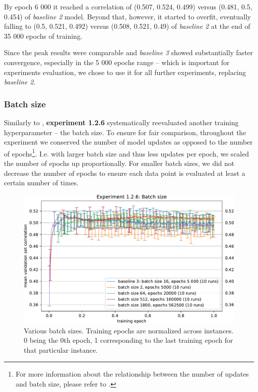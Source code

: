 By epoch 6 000 it reached a correlation of (0.507, 0.524, 0.499) versus (0.481, 0.5, 0.454) of \emph{baseline 2} model. Beyond that, however, it started to overfit, eventually falling to (0.5, 0.521, 0.492) versus (0.508, 0.521, 0.49) of \emph{baseline 2} at the end of 35 000 epochs of training. 

Since the peak results were comparable and \emph{baseline 3} showed substantially faster convergence, especially in the 5 000 epochs range -- which is important for experiments evaluation, we chose to use it for all further experiments, replacing \emph{baseline 2}.

\subsubsection{Batch size}

Similarly to , \textbf{experiment 1.2.6} systematically reevaluated another training hyperparameter -- the batch size. To ensure for fair comparison, throughout the experiment we conserved the number of model updates as opposed to the number of epochs\footnote{For more information about the relationship between the number of updates and batch size, please refer to .}. I.e. with larger batch size and thus less updates per epoch, we scaled the number of epochs up proportionally. For smaller batch sizes, we did not decrease the number of epochs to ensure each data point is evaluated at least a certain number of times.

\begin{figure}[H]
    \centering
    \includegraphics[width=1\textwidth]{../figures/05_1_2_6}
    \caption[Experiment 1.2.6]{Various batch sizes. Training epochs are normalized across instances. 0 being the 0th epoch, 1 corresponding to the last training epoch for that particular instance.}
    \label{fig:5.1.2.6}
\end{figure}

